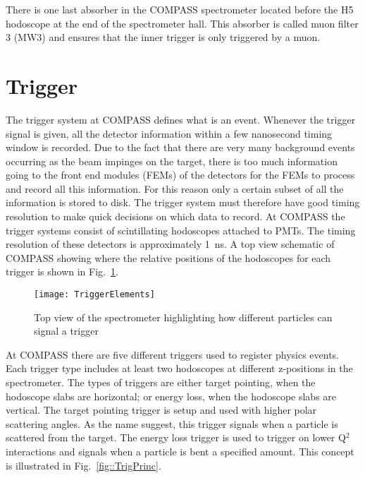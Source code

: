 There is one last absorber in the COMPASS spectrometer located before the H5
hodoscope at the end of the spectrometer hall.  This absorber is called muon
filter 3 (MW3) and ensures that the inner trigger is only triggered by a
muon. \par


\section{Trigger}
The trigger system at COMPASS defines what is an event.  Whenever the trigger
signal is given, all the detector information within a few nanosecond timing
window is recorded.  Due to the fact that there are very many background events
occurring as the beam impinges on the target, there is too much information
going to the front end modules (FEMs) of the detectors for the FEMs to process
and record all this information.  For this reason only a certain subset of all
the information is stored to disk.  The trigger system must therefore have good
timing resolution to make quick decisions on which data to record.  At COMPASS
the trigger systems consist of scintillating hodoscopes attached to PMTs.  The
timing resolution of these detectors is approximately 1~ns.  A top view
schematic of COMPASS showing where the relative positions of the hodoscopes for
each trigger is shown in Fig.~\ref{fig::TriggerElements}.  \par

\begin{figure}[h!t]
  \centering
  \texttt{[image: TriggerElements]}
  \caption{Top view of the spectrometer highlighting how different particles can
    signal a trigger}
  \label{fig::TriggerElements}
\end{figure}

At COMPASS there are five different triggers used to register physics events.
Each trigger type includes at least two hodoscopes at different z-positions in
the spectrometer.  The types of triggers are either target pointing, when the
hodoscope slabs are horizontal; or energy loss, when the hodoscope slabs are
vertical.  The target pointing trigger is setup and used with higher polar
scattering angles.  As the name suggest, this trigger signals when a particle is
scattered from the target.  The energy loss trigger is used to trigger on lower
Q$^2$ interactions and signals when a particle is bent a specified amount.
This concept is illustrated in Fig.~\ref{fig::TrigPrinc}.  \par

